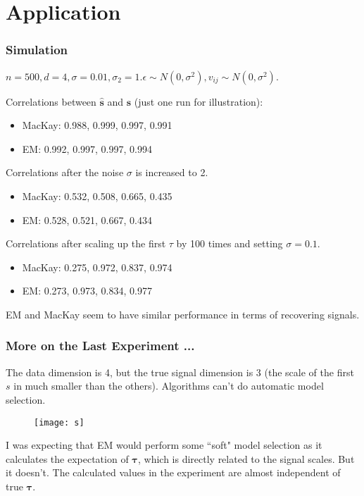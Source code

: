 \documentclass{beamer}
\begin{document}
\section{Application}
\begin{frame}
\frametitle{Simulation}
\footnotesize
$n=500, d=4, \sigma = 0.01, \sigma_2 = 1. \epsilon \sim N(0, \sigma^2), v_{ij} \sim N(0, \sigma^2)$. 
\vspace{0.1in}

{\footnotesize
Correlations between $ \bm{\hat s}$ and $\bm{s}$ (just one run for illustration):
\begin{itemize}
\item MacKay: 0.988, 0.999, 0.997, 0.991
\item EM: 0.992, 0.997, 0.997, 0.994
\end{itemize}

\vspace{0.1in}
Correlations after the noise $\sigma$ is increased to 2.
\begin{itemize}
\item MacKay: 0.532, 0.508, 0.665, 0.435
\item EM: 0.528, 0.521, 0.667, 0.434
\end{itemize}

\vspace{0.1in}
Correlations after scaling up the first $\tau$ by 100 times and setting $\sigma = 0.1$.
\begin{itemize}
\item MacKay: 0.275, 0.972, 0.837, 0.974
\item EM: 0.273, 0.973, 0.834, 0.977
\end{itemize}
}

EM and MacKay seem to have similar performance in terms of recovering signals.
\end{frame}

\begin{frame}
\frametitle{More on the Last Experiment ...}
\footnotesize
The data dimension is 4, but the true signal dimension is 3 (the scale of the first $s$ in much smaller than the others). Algorithms can't do automatic model selection. 
\begin{figure}
	\centering
	\texttt{[image: s]}
\end{figure}
\footnotesize
I was expecting that EM would perform some ``soft" model selection as it calculates the expectation of $\bm{\tau}$, which is directly related to the signal scales. But it doesn't. The calculated values in the experiment are almost independent of true $\bm{\tau}$.
\end{frame}
\end{document}
